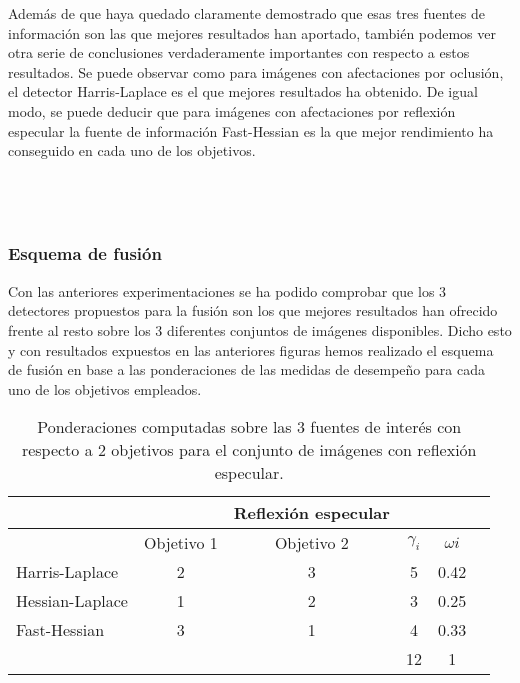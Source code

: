 Además de que haya quedado claramente demostrado que esas tres fuentes de información son las que mejores resultados han aportado, también podemos ver otra serie de conclusiones verdaderamente importantes con respecto a estos resultados. Se puede observar como para imágenes con afectaciones por oclusión, el detector Harris-Laplace es el que mejores resultados ha obtenido. De igual modo, se puede deducir que para imágenes con afectaciones por reflexión especular la fuente de información Fast-Hessian es la que mejor rendimiento ha conseguido en cada uno de los objetivos. \\  \\  \\  \\


\subsubsection{Esquema de fusión }
Con las anteriores experimentaciones se ha podido comprobar que los 3 detectores propuestos para la fusión son los que mejores resultados han ofrecido frente al resto sobre los 3 diferentes conjuntos de imágenes disponibles. Dicho esto y con resultados expuestos en las anteriores figuras hemos realizado el esquema de fusión en base a las ponderaciones de las medidas de desempeño para cada uno de los objetivos empleados. \\

\begin{table}[h]
\begin{center}
\begin{tabular}{@{}lccccc@{}}
\toprule
&	&  	Reflexión especular		& &  \\ \hline
&Objetivo 1   &  Objetivo 2   & \( \gamma_{i} \) &  \( \omega{i} \) \\ \hline
Harris-Laplace& 2    &  3 & 5 & 0.42 \\
Hessian-Laplace& 1   &  2  & 3 & 0.25 \\
Fast-Hessian& 3  &  	1 & 4 & 0.33  \\ \hline
&   &  	 & 12 & 1  \\ \hline

\end{tabular}
\end{center}
\caption{Ponderaciones computadas sobre las 3 fuentes de interés con respecto a 2 objetivos para el conjunto de imágenes con reflexión especular.}
\label{my_tabla}
\end{table}

